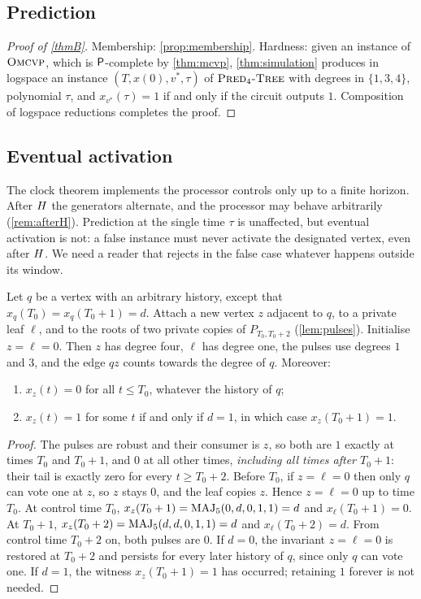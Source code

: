 \subsection{Prediction}

\begin{proof}[Proof of \cref{thmB}]
Membership: \cref{prop:membership}. Hardness: given an instance of $\textsc{Omcvp}$, which is
$\mathsf{P}$-complete by \cref{thm:mcvp}, \cref{thm:simulation} produces in logspace an instance
$(T,x(0),v^\ast,\tau)$ of $\textsc{Pred}_4\textsc{-Tree}$ with degrees in $\{1,3,4\}$, polynomial $\tau$, and
$x_{v^\ast}(\tau)=1$ if and only if the circuit outputs $1$. Composition of logspace reductions
\cite{Jon75,LL76} completes the proof.
\end{proof}

\subsection{Eventual activation}\label{sec:ever}

The clock theorem implements the processor controls only up to a finite horizon. After $H$ the
generators alternate, and the processor may behave arbitrarily (\cref{rem:afterH}). Prediction at the
single time $\tau$ is unaffected, but eventual activation is not: a false instance must never
activate the designated vertex, even after $H$. We need a reader that rejects in the false case
whatever happens outside its window.

\begin{lemma}\label{lem:reader}
Let $q$ be a vertex with an arbitrary history, except that $x_q(T_0)=x_q(T_0+1)=d$. Attach a new
vertex $z$ adjacent to $q$, to a private leaf $\ell$, and to the roots of two private copies of
$P_{T_0,T_0+2}$ (\cref{lem:pulses}). Initialise $z=\ell=0$. Then $z$ has degree four, $\ell$ has
degree one, the pulses use degrees $1$ and $3$, and the edge $qz$ counts towards the degree of $q$.
Moreover:
\begin{enumerate}[label=(\alph*)]
\item $x_z(t)=0$ for all $t\le T_0$, whatever the history of $q$;
\item $x_z(t)=1$ for some $t$ if and only if $d=1$, in which case $x_z(T_0+1)=1$.
\end{enumerate}
\end{lemma}

\begin{proof}
The pulses are robust and their consumer is $z$, so both are $1$ exactly at times $T_0$ and $T_0+1$,
and $0$ at all other times, \emph{including all times after $T_0+1$}: their tail is exactly zero for
every $t\ge T_0+2$. Before $T_0$, if $z=\ell=0$ then only $q$ can vote one at $z$, so $z$ stays $0$,
and the leaf copies $z$. Hence $z=\ell=0$ up to time $T_0$. At control time $T_0$,
$x_z(T_0+1)=\operatorname{MAJ}_5(0,d,0,1,1)=d$ and $x_\ell(T_0+1)=0$. At $T_0+1$,
$x_z(T_0+2)=\operatorname{MAJ}_5(d,d,0,1,1)=d$ and $x_\ell(T_0+2)=d$. From control time $T_0+2$ on, both pulses
are $0$. If $d=0$, the invariant $z=\ell=0$ is restored at $T_0+2$ and persists for every later
history of $q$, since only $q$ can vote one. If $d=1$, the witness $x_z(T_0+1)=1$ has occurred;
retaining $1$ forever is not needed.
\end{proof}

